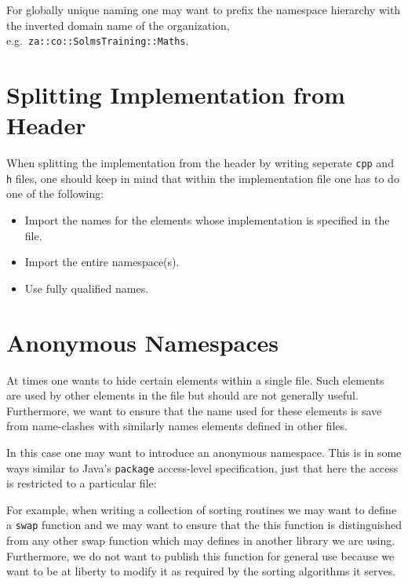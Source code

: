 For globally unique naming one may want to prefix
the namespace hierarchy with the inverted domain name of the
organization, e.g.\ \verb+za::co::SolmsTraining::Maths+.


\section{Splitting Implementation from Header}

When splitting the implementation from the header by writing seperate
\verb+cpp+ and \verb+h+ files, one should keep in mind that within the 
implementation file one has to do one of the following:
\begin{itemize}
  \item Import the names for the elements whose implementation is
        specified in the file.
  \item Import the entire namespace(s). 
  \item Use fully qualified names.
\end{itemize}  


\section{Anonymous Namespaces}

At times one wants to hide certain elements within a single file.
Such elements are used by other elements in the file but should
are not generally useful. Furthermore, we want to ensure that the 
name used for these elements is save from name-clashes with 
similarly names elements defined in other files. 

In this case one may want to introduce an anonymous namespace. This 
is in some ways similar to Java's \verb+package+ access-level 
specification, just that here the access is restricted to a particular
file:

For example, when writing a collection of sorting routines we may 
want to define a \verb+swap+ function and we may want to ensure that 
the this function is distinguished from any other swap function which
may defines in another library we are using. Furthermore, we do not want
to publish this function for general use because we want to be at 
liberty to modify it as required by the sorting algorithms it serves.


